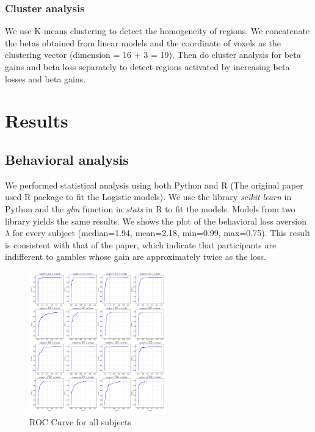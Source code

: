 \documentclass[11pt]{article}
\begin{document}
\subsubsection{Cluster analysis}

We use K-means clustering to detect the homogeneity of regions. We concatenate 
the betas obtained from linear models and the coordinate of voxels as the 
clustering vector (dimension = 16 + 3 = 19). Then do cluster analysis for beta 
gains and beta loss separately to detect regions activated by increasing beta 
losses and beta gains.


\section{Results}

\subsection{Behavioral analysis}

We performed statistical analysis using both Python and R (The original paper 
used R package to fit the Logistic models). We use the library 
\emph{scikit-learn} in Python and the \emph{glm} function in \emph{stats} in R 
to fit the models. Models from two library yields the same results. We shows 
the plot of the behavioral loss aversion $\lambda$ for every subject 
(median=1.94, mean=2.18, min=0.99, max=0.75). This result is consistent with 
that of the paper, which indicate that participants are indifferent to gambles 
whose gain are approximately twice as the loss. 


\begin{figure}
  \begin{center}
    \includegraphics[width=0.53\textwidth]{figures/Regression1/roc_curve.png} 
    \caption{ROC Curve for all subjects}
  \end{center}
\end{figure}
\end{document}
